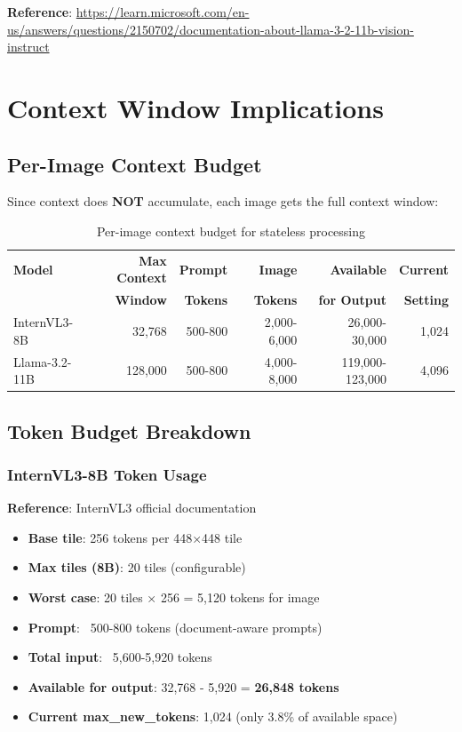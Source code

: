 \documentclass[11pt,a4paper]{article}
\begin{document}
\textbf{Reference}: \url{https://learn.microsoft.com/en-us/answers/questions/2150702/documentation-about-llama-3-2-11b-vision-instruct}

\section{Context Window Implications}

\subsection{Per-Image Context Budget}

Since context does \textbf{NOT} accumulate, each image gets the full context window:

\begin{table}[h]
\centering
\small
\begin{tabular}{lrrrrr}
\toprule
\textbf{Model} & \textbf{Max Context} & \textbf{Prompt} & \textbf{Image} & \textbf{Available} & \textbf{Current} \\
& \textbf{Window} & \textbf{Tokens} & \textbf{Tokens} & \textbf{for Output} & \textbf{Setting} \\
\midrule
InternVL3-8B & 32,768 & ~500-800 & ~2,000-6,000 & ~26,000-30,000 & 1,024 \\
Llama-3.2-11B & 128,000 & ~500-800 & ~4,000-8,000 & ~119,000-123,000 & 4,096 \\
\bottomrule
\end{tabular}
\caption{Per-image context budget for stateless processing}
\end{table}

\subsection{Token Budget Breakdown}

\subsubsection{InternVL3-8B Token Usage}

\textbf{Reference}: InternVL3 official documentation

\begin{itemize}[leftmargin=*]
    \item \textbf{Base tile}: 256 tokens per 448×448 tile
    \item \textbf{Max tiles (8B)}: 20 tiles (configurable)
    \item \textbf{Worst case}: 20 tiles × 256 = 5,120 tokens for image
    \item \textbf{Prompt}: ~500-800 tokens (document-aware prompts)
    \item \textbf{Total input}: ~5,600-5,920 tokens
    \item \textbf{Available for output}: 32,768 - 5,920 = \textbf{26,848 tokens}
    \item \textbf{Current max\_new\_tokens}: 1,024 (only 3.8\% of available space)
\end{itemize}
\end{document}
